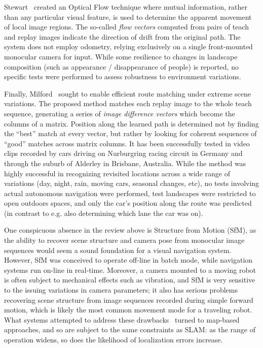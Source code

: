\documentclass[twocolumn, 9pt,fleqn]{jsproceedings}
\begin{document}
Stewart~\cite{STE12} created an Optical Flow technique where mutual information, rather than any particular visual feature, is used to determine the apparent movement of local image regions. The so-called \textit{flow vectors} computed from pairs of teach and replay images indicate the direction of drift from the original path. The system does not employ odometry, relying exclusively on a single front-mounted monocular camera for input. While some resilience to changes in landscape composition (such as appearance / disappearance of people) is reported, no specific tests were performed to assess robustness to environment variations.

Finally, Milford~\cite{MIL12} sought to enable efficient route matching under extreme scene variations. The proposed method matches each replay image to the whole teach sequence, generating a series of \textit{image difference vectors} which become the columns of a matrix. Position along the learned path is determined not by finding the ``best'' match at every vector, but rather by looking for coherent sequences of ``good'' matches across matrix columns. It has been successfully tested in video clips recorded by cars driving on Nurburgring racing circuit in Germany and through the suburb of Alderley in Brisbane, Australia. While the method was highly successful in recognizing revisited locations across a wide range of variations (day, night, rain, moving cars, seasonal changes, etc), no tests involving actual autonomous navigation were performed, test landscapes were restricted to open outdoors spaces, and only the car's position along the route was predicted (in contrast to e.g. also determining which lane the car was on).

One conspicuous absence in the review above is Structure from Motion (SfM), as the ability to recover scene structure and camera pose from monocular image sequences would seem a sound foundation for a visual navigation system. However, SfM was conceived to operate off-line in batch mode, while navigation systems run on-line in real-time. Moreover, a camera mounted to a moving robot is often subject to mechanical effects such as vibration, and SfM is very sensitive to the issuing variations in camera parameters; it also has serious problems recovering scene structure from image sequences recorded during simple forward motion, which is likely the most common movement mode for a traveling robot. What systems attempted to address these drawbacks~\cite{BEA97,ROY07} turned to map-based approaches, and so are subject to the same constraints as SLAM: as the range of operation widens, so does the likelihood of localization errors increase.
\end{document}
